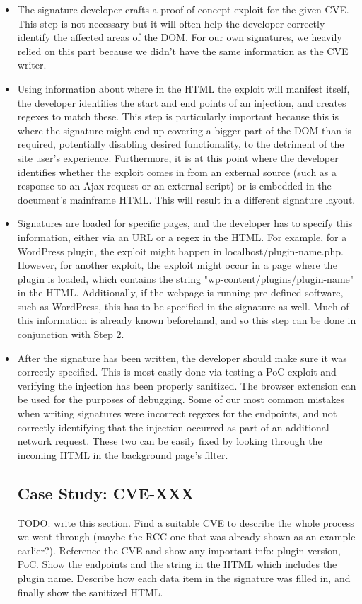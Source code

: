 \begin{itemize}
	\item{
The signature developer crafts a proof of concept exploit for the given CVE. This step is not necessary but it will often help the developer correctly identify the affected areas of the DOM. For our own signatures, we heavily relied on this part because we didn't have the same information as the CVE writer.}
\item
Using information about where in the HTML the exploit will manifest itself, the developer identifies the start and end points of an injection, and creates regexes to match these. This step is particularly important because this is where the signature might end up covering a bigger part of the DOM than is required, potentially disabling desired functionality, to the detriment of the site user's experience. Furthermore, it is at this point where the developer identifies whether the exploit comes in from an external source (such as a response to an Ajax request or an external script) or is embedded in the document's mainframe HTML. This will result in a different signature layout. 
\item
Signatures are loaded for specific pages, and the developer has to specify this information, either via an URL or a regex in the HTML. For example, for a WordPress plugin, the exploit might happen in localhost/plugin-name.php. However, for another exploit, the exploit might occur in a page where the plugin is loaded, which contains the string "wp-content/plugins/plugin-name" in the HTML. Additionally, if the webpage is running pre-defined software, such as WordPress, this has to be specified in the signature as well. Much of this information is already known beforehand, and so this step can be done in conjunction with Step 2.
\item
After the signature has been written, the developer should make sure it was correctly specified. This is most easily done via testing a PoC exploit and verifying the injection has been properly sanitized. The browser extension can be used for the purposes of debugging. Some of our most common mistakes when writing signatures were incorrect regexes for the endpoints, and not correctly identifying that the injection occurred as part of an additional network request. These two can be easily fixed by looking through the incoming HTML in the background page's filter. 

\subsection{Case Study: CVE-XXX}
TODO: write this section. Find a suitable CVE to describe the whole process we went through (maybe the RCC one that was already shown as an example earlier?).
Reference the CVE and show any important info: plugin version, PoC. Show the endpoints and the string in the HTML which includes the plugin name. Describe how each data item in the signature was filled in, and finally show the sanitized HTML. 
\end{itemize}


